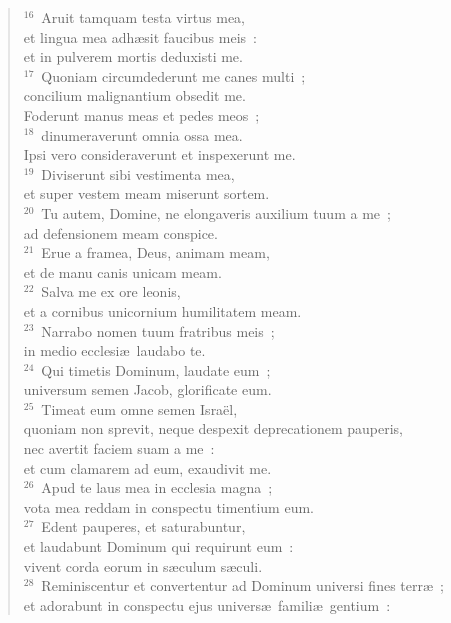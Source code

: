 \begin{flushleft}
\begin{verse}
${}^{16}$~Aruit tamquam testa virtus mea,\\ et lingua mea adh\ae sit faucibus meis~:\\ et in pulverem mortis deduxisti me.\\
${}^{17}$~Quoniam circumdederunt me canes multi~;\\ concilium malignantium obsedit me.\\ Foderunt manus meas et pedes meos~;\\
${}^{18}$~dinumeraverunt omnia ossa mea.\\ Ipsi vero consideraverunt et inspexerunt me.\\
${}^{19}$~Diviserunt sibi vestimenta mea,\\ et super vestem meam miserunt sortem.\\
${}^{20}$~Tu autem, Domine, ne elongaveris auxilium tuum a me~;\\ ad defensionem meam conspice.\\
${}^{21}$~Erue a framea, Deus, animam meam,\\ et de manu canis unicam meam.\\
${}^{22}$~Salva me ex ore leonis,\\ et a cornibus unicornium humilitatem meam.\\
${}^{23}$~Narrabo nomen tuum fratribus meis~;\\ in medio ecclesi\ae\ laudabo te.\\
${}^{24}$~Qui timetis Dominum, laudate eum~;\\ universum semen Jacob, glorificate eum.\\
${}^{25}$~Timeat eum omne semen Isra\"el,\\ quoniam non sprevit, neque despexit deprecationem pauperis,\\ nec avertit faciem suam a me~:\\ et cum clamarem ad eum, exaudivit me.\\
${}^{26}$~Apud te laus mea in ecclesia magna~;\\ vota mea reddam in conspectu timentium eum.\\
${}^{27}$~Edent pauperes, et saturabuntur,\\ et laudabunt Dominum qui requirunt eum~:\\ vivent corda eorum in s\ae culum s\ae culi.\\
${}^{28}$~Reminiscentur et convertentur ad Dominum universi fines terr\ae~;\\ et adorabunt in conspectu ejus univers\ae\ famili\ae\ gentium~:\\

\end{verse}
\end{flushleft}
